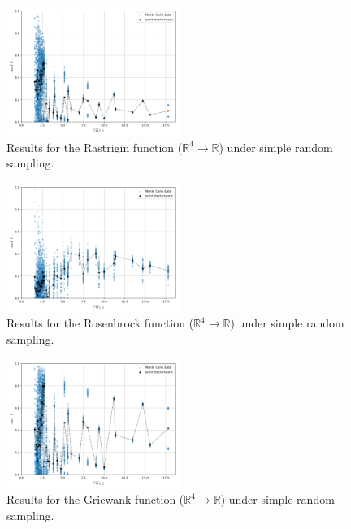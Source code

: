 \documentclass[conference]{IEEEtran}
\begin{document}
\begin{figure}[htbp]
	\centerline{\includegraphics[width=0.5\textwidth]{results/rastrigin/results_sampling_simple_random_dimensionality_4.png}}
	\caption{Results for the Rastrigin function ($\mathbb{R}^4\to\mathbb{R}$) under simple random sampling.}
	\label{fig:Rastrigin_results_simple_random}
\end{figure}

\begin{figure}[htbp]
	\centerline{\includegraphics[width=0.5\textwidth]{results/rosenbrock/results_sampling_simple_random_dimensionality_4.png}}
	\caption{Results for the Rosenbrock function ($\mathbb{R}^4\to\mathbb{R}$) under simple random sampling.}
	\label{fig:Rosenbrock_results_simple_random}
\end{figure}

\begin{figure}[htbp]
	\centerline{\includegraphics[width=0.5\textwidth]{results/griewank/results_sampling_simple_random_dimensionality_4.png}}
	\caption{Results for the Griewank function ($\mathbb{R}^4\to\mathbb{R}$) under simple random sampling.}
	\label{fig:Griewank_results_simple_random}
\end{figure}
\end{document}

